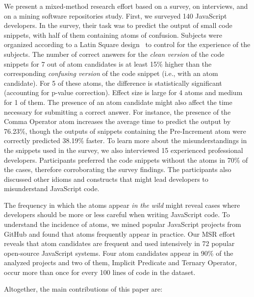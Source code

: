 We present a mixed-method research effort based on a survey, on interviews, and on a mining software repositories study. First, we surveyed 140 JavaScript developers. In the survey, their task was to predict the output of small code snippets, with half of them containing atoms of confusion. Subjects were organized according to a Latin Square design~\cite{Hunter-Experimenters} to control for the experience of the subjects. The number of correct answers for the \emph{clean version} of the code snippets for 7 out of \na atom candidates is at least 15\% higher than the corresponding \emph{confusing version} of the code snippet (i.e., with an atom candidate). For 5 of these atoms, the difference is statistically significant (accounting for p-value correction). Effect size is large for 4 atoms and medium for 1 of them. 
The presence of an atom candidate might also affect the time necessary for submitting a correct answer. For instance, the presence of the Comma Operator atom increases the average time to predict the output by 76.23\%, though the outputs of snippets containing the Pre-Increment atom were correctly predicted 38.19\% faster.
To learn more about the misunderstandings in the snippets used in the survey, we also interviewed 15 experienced professional developers. Participants preferred the code snippets without the atoms in 70\% of the cases, therefore corroborating the survey findings. The participants also discussed other idioms and constructs that might lead developers to misunderstand JavaScript code.

The frequency in which the atoms appear \emph{in the wild} might reveal cases where developers should be more or less careful when writing JavaScript code. To understand the incidence of atoms, we mined popular JavaScript projects from GitHub and found that atoms frequently appear in practice. 
Our MSR effort reveals that atom candidates are frequent and used intensively in 72 popular open-source JavaScript systems. Four atom candidates appear in 90\% of the analyzed projects and two of them, Implicit Predicate and Ternary Operator, occur more than once for every 100 lines of code in the dataset. 

Altogether, the main contributions of this paper are:

